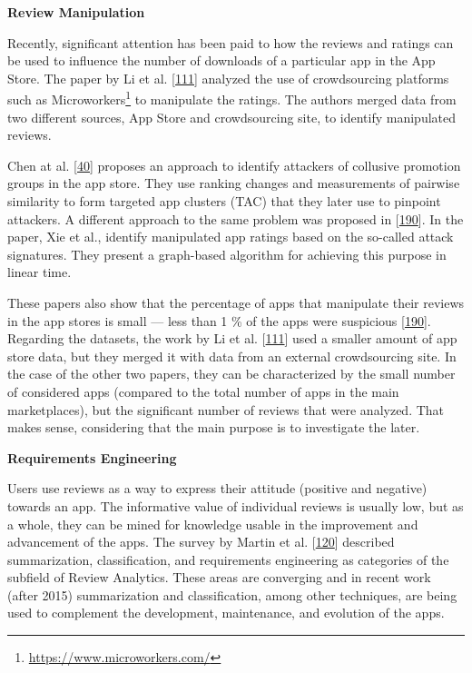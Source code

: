 \documentclass[]{book}
\let\rmarkdownfootnote\footnote%
\def\footnote{\protect\rmarkdownfootnote}
\begin{document}
\textbf{Review Manipulation}

Recently, significant attention has been paid to how the reviews and
ratings can be used to influence the number of downloads of a particular
app in the App Store. The paper by Li et al.
{[}\protect\hyperlink{ref-i2017crowdsourced}{111}{]} analyzed the use of
crowdsourcing platforms such as Microworkers\footnote{\url{https://www.microworkers.com/}}
to manipulate the ratings. The authors merged data from two different
sources, App Store and crowdsourcing site, to identify manipulated
reviews.

Chen at al. {[}\protect\hyperlink{ref-chen2017toward}{40}{]} proposes an
approach to identify attackers of collusive promotion groups in the app
store. They use ranking changes and measurements of pairwise similarity
to form targeted app clusters (TAC) that they later use to pinpoint
attackers. A different approach to the same problem was proposed in
{[}\protect\hyperlink{ref-xie2016you}{190}{]}. In the paper, Xie et al.,
identify manipulated app ratings based on the so-called attack
signatures. They present a graph-based algorithm for achieving this
purpose in linear time.

These papers also show that the percentage of apps that manipulate their
reviews in the app stores is small --- less than 1 \% of the apps were
suspicious {[}\protect\hyperlink{ref-xie2016you}{190}{]}. Regarding the
datasets, the work by Li et al.
{[}\protect\hyperlink{ref-i2017crowdsourced}{111}{]} used a smaller
amount of app store data, but they merged it with data from an external
crowdsourcing site. In the case of the other two papers, they can be
characterized by the small number of considered apps (compared to the
total number of apps in the main marketplaces), but the significant
number of reviews that were analyzed. That makes sense, considering that
the main purpose is to investigate the later.

\textbf{Requirements Engineering}

Users use reviews as a way to express their attitude (positive and
negative) towards an app. The informative value of individual reviews is
usually low, but as a whole, they can be mined for knowledge usable in
the improvement and advancement of the apps. The survey by Martin et al.
{[}\protect\hyperlink{ref-martin2015survey}{120}{]} described
summarization, classification, and requirements engineering as
categories of the subfield of Review Analytics. These areas are
converging and in recent work (after 2015) summarization and
classification, among other techniques, are being used to complement the
development, maintenance, and evolution of the apps.
\end{document}
